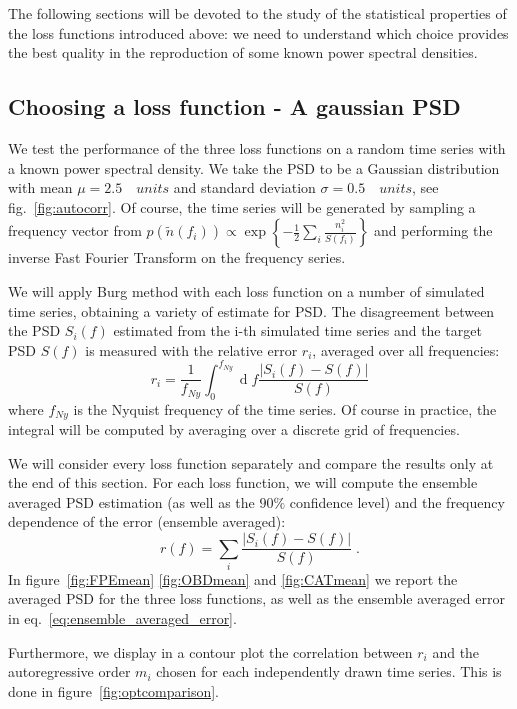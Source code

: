 \documentclass[twocolumn,showpacs,preprintnumbers,nofootinbib,prd,
superscriptaddress,10pt]{revtex4-1}
\renewcommand{\d}[1]{\ensuremath{\operatorname{d}\!{#1}}}
\begin{document}
The following sections will be devoted to the study of the statistical properties of the loss functions introduced above: we need to understand which choice provides the best quality in the reproduction of some known power spectral densities. 

\subsection{Choosing a loss function - A gaussian PSD} \label{sec:arp_validation}
We test the performance of the three loss functions on a random time series with a known power spectral density.
We take the PSD to be a Gaussian distribution with mean $\mu = 2.5 \quad units$ and standard deviation $\sigma = 0.5 \quad units$, see fig.~\ref{fig:autocorr}.
Of course, the time series will be generated by sampling a frequency vector from ${p(\tilde{n}(f_i)) \propto \exp{\left\{-\frac{1}{2}\sum_i\frac{n_i ^2}{S(f_i)}\right\}}}$ and performing the inverse Fast Fourier Transform on the frequency series.

We will apply Burg method with each loss function on a number of simulated time series, obtaining a variety of estimate for PSD.
The disagreement between the PSD $S_i(f)$ estimated from the i-th simulated time series and the target PSD $S(f)$ is measured with the relative error $r_i$, averaged over all frequencies:
\begin{equation}
r_i = \frac{1}{f_{Ny}}\int_0^{f_{Ny}} \d{f} \frac{|S_i(f) - S(f)|}{S(f)}
\end{equation}
where $f_{Ny}$ is the Nyquist frequency of the time series. Of course in practice, the integral will be computed by averaging over a discrete grid of frequencies.

We will consider every loss function separately and compare the results only at the end of this section.
For each loss function, we will compute the ensemble averaged PSD estimation (as well as the $90\%$ confidence level) and the frequency dependence of the error (ensemble averaged):
\begin{equation}\label{eq:ensemble_averaged_error}
	r(f) = \sum_i \frac{|S_i(f) - S(f)|}{S(f)} \;.
\end{equation}
In figure~\ref{fig:FPEmean} \ref{fig:OBDmean} and \ref{fig:CATmean} we report the averaged PSD for the three loss functions, as well as the ensemble averaged error in eq.~\ref{eq:ensemble_averaged_error}.

Furthermore, we display in a contour plot the correlation between $r_i$ and the autoregressive order $m_i$ chosen for each independently drawn time series.
This is done in figure~\ref{fig:optcomparison}.
\end{document}
